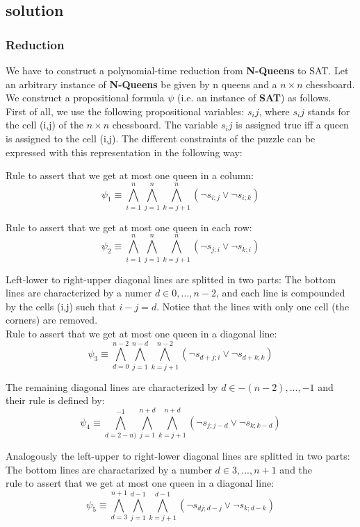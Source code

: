 \subsection{solution}


\subsubsection{Reduction}
We have to construct a polynomial-time reduction from \textbf{N-Queens} to SAT. Let an arbitrary 
instance of \textbf{N-Queens} be given by n queens and a $n \times n$ chessboard. 
We construct a propositional formula $\psi$ (i.e. an instance of \textbf{SAT}) as follows.\\
First of all, we use the following propositional variables:
$s_ij$, where $s_ij$ stands for the cell (i,j) of the $n \times n$ chessboard. 
The variable $s_ij$ is assigned true iff a queen is assigned to the cell (i,j).
The different constraints of the puzzle can be expressed with this representation 
in the following way:

\noindent Rule to assert that we get at most one queen in a column:
$$\psi_1 \equiv \bigwedge_{i=1}^{n}\bigwedge_{j=1}^{n}\bigwedge_{k=j+1}^{n}(\neg s_{i;j} \vee \neg s_{i;k})$$

\noindent Rule to assert that we get at most one queen in each row:
$$\psi_2 \equiv \bigwedge_{i=1}^{n}\bigwedge_{j=1}^{n}\bigwedge_{k=j+1}^{n}(\neg s_{j;i} \vee \neg s_{k;i})$$

\noindent Left-lower to right-upper diagonal lines are splitted in two parts:
The bottom lines are characterized by a numer $d \in {0,...,n-2}$, and each line is 
compounded by the cells (i,j) such that $i-j=d$.
Notice that the lines with only one cell (the corners) are removed.\\
Rule to assert that we get at most one queen in a diagonal line:
$$\psi_3 \equiv \bigwedge_{d=0}^{n-2}\bigwedge_{j=1}^{n-d}\bigwedge_{k=j+1}^{n-2}(\neg s_{d+j;i} \vee \neg s_{d+k;k})$$

\noindent The remaining diagonal lines are characterized by $d \in {-(n-2),...,-1}$ and their rule is defined by:
$$\psi_4 \equiv \bigwedge_{d=2-n)}^{-1}\bigwedge_{j=1}^{n+d}\bigwedge_{k=j+1}^{n+d}(\neg s_{j;j-d} \vee \neg s_{k;k-d})$$

\noindent Analogously the left-upper to right-lower diagonal lines are splitted in two parts: 
The bottom lines are charactarized by a number $d \in {3,...,n+1}$ and the\\
rule to assert that we get at most one queen in a diagonal line:
$$\psi_5 \equiv \bigwedge_{d=3}^{n+1}\bigwedge_{j=1}^{d-1}\bigwedge_{k=j+1}^{d-1}(\neg s_{dj;d-j} \vee \neg s_{k;d-k})$$

